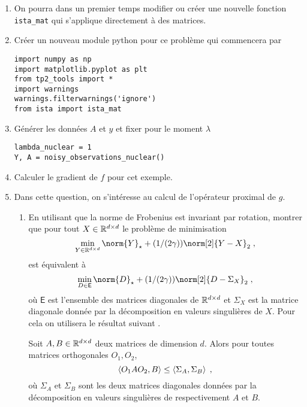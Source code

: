 \documentclass[a4paper,french,12pt]{article}
\begin{document}
\begin{enumerate}[resume]
\item On pourra dans un premier temps modifier ou créer une nouvelle fonction \lstinline+ista_mat+ qui s'applique directement à des matrices. 
\item Créer un nouveau module python pour ce problème qui commencera par
\begin{lstlisting}
import numpy as np
import matplotlib.pyplot as plt
from tp2_tools import *
import warnings
warnings.filterwarnings('ignore')
from ista import ista_mat
\end{lstlisting}
\item Générer les données $A$ et $y$ et fixer pour le moment $\lambda$
  \begin{lstlisting}
lambda_nuclear = 1
Y, A = noisy_observations_nuclear()
  \end{lstlisting}
\item Calculer le gradient de $f$ pour cet exemple.
\item Dans cette question, on s'intéresse au calcul de l'opérateur proximal de $g$.
  \begin{enumerate}
  \item En utilisant que la norme de Frobenius est invariant par
    rotation, montrer que pour tout $X \in \mathbb{R}^{d \times d}$  le problème de minimisation
    \begin{equation}
      \label{eq:prox_nuclea_proof_1}
      \min_{Y \in \rset^{d\times d} } \norm{Y}_{\star} +(1/(2\gamma)) \norm[2]{Y-X}_2 \eqsp,
    \end{equation}
    est équivalent à  
          \begin{equation}
      \label{eq:prox_nuclea_proof_2}
      \min_{D \in \mathsf{E}} \norm{D}_{\star} +(1/(2\gamma)) \norm[2]{D-\Sigma_X}_2 \eqsp,
    \end{equation}
    où $\mathsf{E}$ est l'ensemble des matrices diagonales de $\mathbb{R}^{d \times d}$ et $\Sigma_X$ est la matrice diagonale donnée par la décomposition en valeurs singulières de $X$.
    Pour cela on utilisera le résultat suivant \cite{vonNeumann_1937}.
    \begin{theoreme}
      \label{theofr:van_neu_svd}
      Soit $A,B \in \mathbb{R}^{d \times d}$ deux matrices de dimension $d$. Alors pour toutes matrices orthogonales $O_1,O_2$,
      \begin{equation*}
        \left\langle O_1 A O_2,B \right\rangle \leq \left\langle\Sigma_A,\Sigma_B \right\rangle \;,
      \end{equation*}
      où $\Sigma_A$ et $\Sigma_B$ sont les deux matrices diagonales données par la décomposition en valeurs singulières de respectivement $A$ et $B$.

\end{theoreme}
\end{enumerate}
\end{enumerate}
\end{document}
